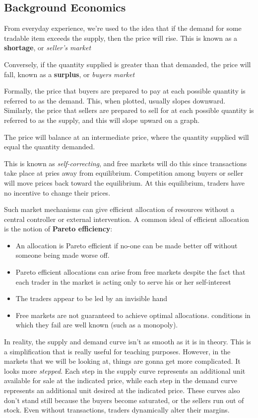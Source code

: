 \documentclass[11pt,a4paper,titlepage,dvipsnames,cmyk]{scrartcl}
\begin{document}
\subsection{Background Economics}
From everyday experience, we're used to the idea that if the demand for some tradable item exceeds the supply, then the price will rise. This is known as a \textbf{shortage}, or \textit{seller's market}

Conversely, if the quantity supplied is greater than that demanded, the price will fall, known as a \textbf{surplus}, or \textit{buyers market}

Formally, the price that buyers are prepared to pay at each possible quantity is referred to as the demand. This, when plotted, usually slopes downward. Similarly, the price that sellers are prepared to sell for at each possible quantity is referred to as the supply, and this will slope upward on a graph.

The price will balance at an intermediate price, where the quantity supplied will equal the quantity demanded.

This is known as \textit{self-correcting}, and free markets will do this since transactions take place at pries away from equilibrium. Competition among buyers or seller will move prices back toward the equilibrium. At this equilibrium, traders have no incentive to change their prices.

Such market mechanisms can give efficient allocation of resources without a central controller or external intervention. A common ideal of efficient allocation is the notion of \textbf{Pareto efficiency}:
\begin{itemize}
    \item An allocation is Pareto efficient if no-one can be made better off without someone being made worse off.
    \item Pareto efficient allocations can arise from free markets despite the fact that each trader in the market is acting only to serve his or her self-interest
    \item The traders appear to be led by an invisible hand
    \item Free markets are not guaranteed to achieve optimal allocations. conditions in which they fail are well known (such as a monopoly).
\end{itemize}

In reality, the supply and demand curve isn't as smooth as it is in theory. This is a simplification that is really useful for teaching purposes. However, in the markets that we will be looking at, things are gonna get more complicated. It looks more \textit{stepped}. Each step in the supply curve represents an additional unit available for sale at the indicated price, while each step in the demand curve represents an additional unit desired at the indicated price. These curves also don't stand still because the buyers become saturated, or the sellers run out of stock. Even without transactions, traders dynamically alter their margins.
\end{document}
